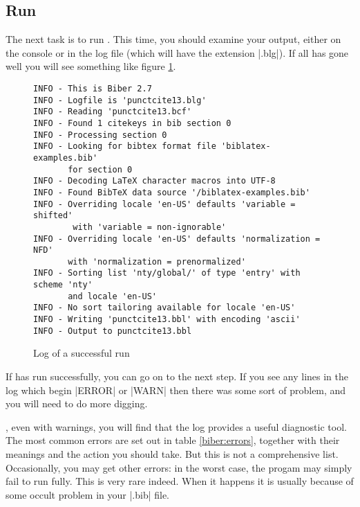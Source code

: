 \subsection{Run }

The next task is to run .  This time, you should
examine your output, either on the console or in the log file (which
will have the extension |.blg|). If all has gone well you will see
something like figure \ref{biber:run}.
\begin{figure}
\begin{Verbatim}[frame=single,fontsize=\small]
INFO - This is Biber 2.7
INFO - Logfile is 'punctcite13.blg'
INFO - Reading 'punctcite13.bcf'
INFO - Found 1 citekeys in bib section 0
INFO - Processing section 0
INFO - Looking for bibtex format file 'biblatex-examples.bib' 
       for section 0
INFO - Decoding LaTeX character macros into UTF-8
INFO - Found BibTeX data source '/biblatex-examples.bib'
INFO - Overriding locale 'en-US' defaults 'variable = shifted'
        with 'variable = non-ignorable'
INFO - Overriding locale 'en-US' defaults 'normalization = NFD' 
       with 'normalization = prenormalized'
INFO - Sorting list 'nty/global/' of type 'entry' with scheme 'nty' 
       and locale 'en-US'
INFO - No sort tailoring available for locale 'en-US'
INFO - Writing 'punctcite13.bbl' with encoding 'ascii'
INFO - Output to punctcite13.bbl
\end{Verbatim}
\caption{Log of a successful  run\label{biber:run}}
\end{figure}

If  has run successfully, you can go on to the next
step. If you see any lines in the log which begin |ERROR| or |WARN|
then there was some sort of problem, and you will need to do more
digging.

, even with
warnings, you will find that the log provides a useful diagnostic
tool. The most common errors are set out in table \ref{biber:errors},
together with their meanings and the action you should take. But this
is not a comprehensive list. Occasionally, you may get other errors:
in the worst case, the progam may simply fail to run fully. This is
very rare indeed. When it happens it is usually because of some occult
problem in your |.bib| file.

